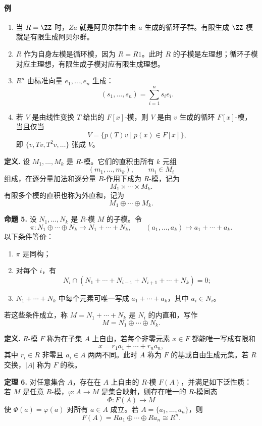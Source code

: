 \paragraph{例}
\begin{enumerate}[label=(\arabic*)]
	\item 当 $R=\ZZ$ 时，$Za$ 就是阿贝尔群中由 $a$ 生成的循环子群。有限生成 $\ZZ$-模就是有限生成阿贝尔群。
	\item $R$ 作为自身左模是循环模，因为 $R=R1$。此时 $R$ 的子模是左理想；循环子模对应主理想，有限生成子模对应有限生成理想。
	\item $R^n$ 由标准向量 $e_1,
	\ldots,e_n$ 生成：
	\[
	(s_1,
	\ldots,s_n)=\sum_{i=1}^n s_i e_i.
	\]
	\item 若 $V$ 是由线性变换 $T$ 给出的 $F[x]$-模，则 $V$ 是由 $v$ 生成的循环 $F[x]$-模，当且仅当
	\[
	V=\{p(T)v\mid p(x)\in F[x]\},
	\]
	即 $\{v,Tv,T^2v,
	\ldots\}$ 张成 $V$。
\end{enumerate}


\noindent\textbf{定义.} 设 $M_1,
\ldots,M_k$ 是 $R$-模。它们的直积由所有 $k$ 元组
\[
(m_1,
\ldots,m_k),
\qquad m_i\in M_i
\]
组成，在逐分量加法和逐分量 $R$-作用下成为 $R$-模，记为
\[
M_1\times\cdots\times M_k.
\]
有限多个模的直积也称为外直和，记为
\[
M_1\oplus\cdots\oplus M_k.
\]


\noindent\textbf{命题 5.} 设 $N_1,
\ldots,N_k$ 是 $R$-模 $M$ 的子模。令
\[
\pi:N_1\oplus\cdots\oplus N_k\longrightarrow N_1+
\cdots+N_k,
\qquad (a_1,
\ldots,a_k)\mapsto a_1+
\cdots+a_k.
\]
以下条件等价：
\begin{enumerate}[label=(\arabic*)]
	\item $\pi$ 是同构；
	\item 对每个 $i$，有
	\[
	N_i\cap(N_1+
	\cdots+N_{i-1}+N_{i+1}+
	\cdots+N_k)=0;
	\]
	\item $N_1+
	\cdots+N_k$ 中每个元素可唯一写成 $a_1+
	\cdots+a_k$，其中 $a_i\in N_i$。
\end{enumerate}
若这些条件成立，称 $M=N_1+
\cdots+N_k$ 是 $N_i$ 的内直和，写作
\[
M=N_1\oplus\cdots\oplus N_k.
\]


\noindent\textbf{定义.} $R$-模 $F$ 称为在子集 $A$ 上自由，若每个非零元素 $x\in F$ 都能唯一写成有限和
\[
x=r_1a_1+
\cdots+r_na_n,
\]
其中 $r_i\in R$ 非零且 $a_i\in A$ 两两不同。此时 $A$ 称为 $F$ 的基或自由生成元集。若 $R$ 交换，$|A|$ 称为 $F$ 的秩。


\noindent\textbf{定理 6.} 对任意集合 $A$，存在在 $A$ 上自由的 $R$-模 $F(A)$，并满足如下泛性质：若 $M$ 是任意 $R$-模，$\varphi:A\to M$ 是集合映射，则存在唯一的 $R$-模同态
\[
\Phi:F(A)\longrightarrow M
\]
使 $\Phi(a)=\varphi(a)$ 对所有 $a\in A$ 成立。若 $A=\{a_1,
\ldots,a_n\}$，则
\[
F(A)=Ra_1\oplus\cdots\oplus Ra_n\cong R^n.
\]

